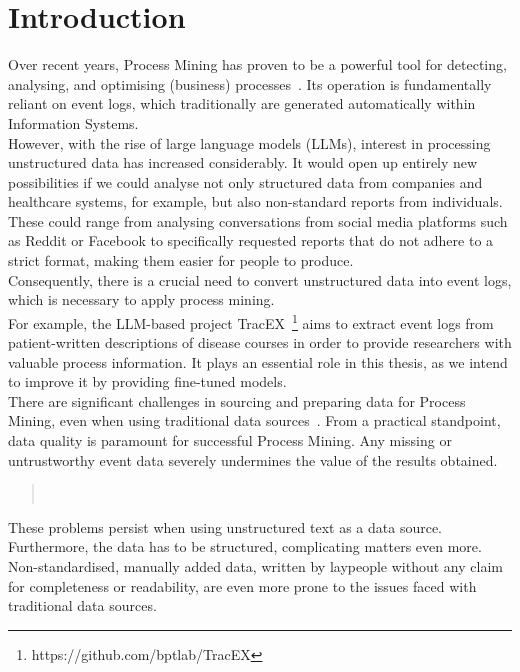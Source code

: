 \section{Introduction}\label{sec:intro}
Over recent years, Process Mining has proven to be a powerful tool for detecting, analysing, and optimising (business) processes~\cite{weske_business_2012}. Its operation is fundamentally reliant on event logs, which traditionally are generated automatically within Information Systems.\\
However, with the rise of large language models (LLMs), interest in processing unstructured data has increased considerably. It would open up entirely new possibilities if we could analyse not only structured data from companies and healthcare systems, for example, but also non-standard reports from individuals. These could range from analysing conversations from social media platforms such as Reddit or Facebook to specifically requested reports that do not adhere to a strict format, making them easier for people to produce.\\
Consequently, there is a crucial need to convert unstructured data into event logs, which is necessary to apply process mining.
\\
For example, the LLM-based project TracEX~\footnote{https://github.com/bptlab/TracEX} aims to extract event logs from patient-written descriptions of disease courses in order to provide researchers with valuable process information. It plays an essential role in this thesis, as we intend to improve it by providing fine-tuned models.\\
There are significant challenges in sourcing and preparing data for Process Mining, even when using traditional data sources~\cite{van_der_aalst_process_2016}. From a practical standpoint, data quality is paramount for successful Process Mining. Any missing or untrustworthy event data severely undermines the value of the results obtained. 
\begin{quote}
    ~\cite{van_der_aalst_process_2016}    
\end{quote}
These problems persist when using unstructured text as a data source. Furthermore, the data has to be structured, complicating matters even more. Non-standardised, manually added data,  written by laypeople without any claim for completeness or readability, are even more prone to the issues faced with traditional data sources.\\
